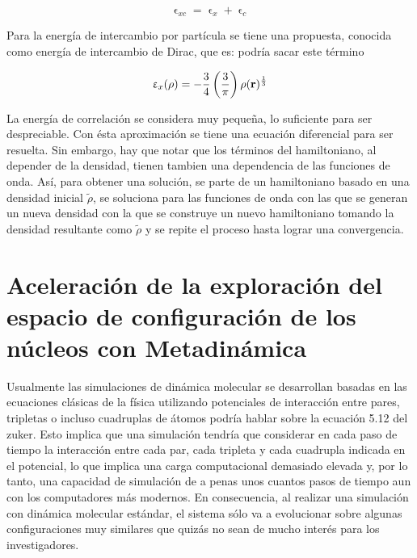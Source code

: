\documentclass [11pt]{article}
\begin{document}
\begin{equation}
    \upvarepsilon_{xc}=\upvarepsilon_{x}+\upvarepsilon_{c}
\end{equation}

Para la energía de intercambio por partícula se tiene una propuesta, conocida como energía de intercambio de Dirac, que es:{\color{magenta} podría sacar este término}

\begin{equation}
    \upvarepsilon_{x}(\rho)=-\frac{3}{4}\left(\frac{3}{\pi}\right)\rho({\bf r})^\frac{1}{3}
\end{equation}

La energía de correlación se considera muy pequeña, lo suficiente para ser despreciable. Con ésta aproximación se tiene una ecuación diferencial para ser resuelta. Sin embargo, hay que notar que los términos del hamiltoniano, al depender de la densidad, tienen tambien una dependencia de las funciones de onda. Así, para obtener una solución, se parte de un hamiltoniano basado en una densidad inicial $\tilde\rho$, se soluciona para las funciones de onda con las que se generan un nueva densidad con la que se construye un nuevo hamiltoniano tomando la densidad resultante como $\tilde\rho$ y se repite el proceso hasta lograr una convergencia.


\section{Aceleración de la exploración del espacio de configuración de los núcleos con Metadinámica}

Usualmente las simulaciones de dinámica molecular se desarrollan basadas en las ecuaciones clásicas de la física utilizando potenciales de interacción entre pares, tripletas o incluso cuadruplas de átomos \cite{zukerman} {\color{magenta} podría hablar sobre la ecuación 5.12 del zuker}. Esto implica que una simulación tendría que considerar en cada paso de tiempo la interacción entre cada par, cada tripleta y cada cuadrupla indicada en el potencial, lo que implica una carga computacional demasiado elevada y, por lo tanto, una capacidad de simulación de a penas unos cuantos pasos de tiempo aun con los computadores más modernos. En consecuencia, al realizar una simulación con dinámica molecular estándar, el sistema sólo va a evolucionar sobre algunas configuraciones muy similares que quizás no sean de mucho interés para los investigadores. 
\end{document}

